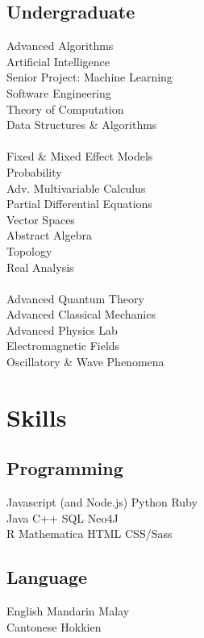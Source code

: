 \documentclass{deedy-resume-openfont}
\begin{document}
\begin{minipage}[t]{0.33\textwidth}
\subsection{Undergraduate}
Advanced Algorithms \\
Artificial Intelligence \\
Senior Project: Machine Learning \\
Software Engineering \\
Theory of Computation \\
Data Structures \& Algorithms \\
\ \\
Fixed \& Mixed Effect Models \\
Probability \\
Adv. Multivariable Calculus \\
Partial Differential Equations \\
Vector Spaces \\
Abstract Algebra \\
Topology \\
Real Analysis \\
\ \\
Advanced Quantum Theory \\
Advanced Classical Mechanics \\
Advanced Physics Lab \\
Electromagnetic Fields \\
Oscillatory \& Wave Phenomena \\

\sectionsep


\section{Skills}
\subsection{Programming}
Javascript (and Node.js) \textbullet{} Python \textbullet{} Ruby \\

Java \textbullet{} C++ \textbullet{} SQL \textbullet{} Neo4J \\
R \textbullet{} Mathematica \textbullet{} HTML \textbullet{} CSS/Sass \\ 
\sectionsep

\subsection{Language}
English \textbullet{} Mandarin \textbullet{} Malay \\ 
Cantonese \textbullet{} Hokkien
\sectionsep

%
%

\end{minipage} 
\end{document}
